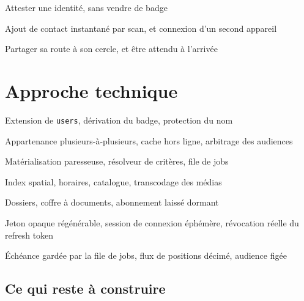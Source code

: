 \documentclass[11pt,a4paper,oneside]{report}
\begin{document}
%
  {Attester une identité, sans vendre de badge}


%
  {Ajout de contact instantané par scan, et connexion d'un second appareil}


%
  {Partager sa route à son cercle, et être attendu à l'arrivée}


\part{Approche technique}

%
  {Extension de \texttt{users}, dérivation du badge, protection du nom}


%
  {Appartenance plusieurs-à-plusieurs, cache hors ligne, arbitrage des audiences}


%
  {Matérialisation paresseuse, résolveur de critères, file de jobs}


%
  {Index spatial, horaires, catalogue, transcodage des médias}


%
  {Dossiers, coffre à documents, abonnement laissé dormant}


%
  {Jeton opaque régénérable, session de connexion éphémère, révocation réelle du refresh token}


%
  {Échéance gardée par la file de jobs, flux de positions décimé, audience figée}


\clearpage
{}
\chapter*{Ce qui reste à construire}
\end{document}
